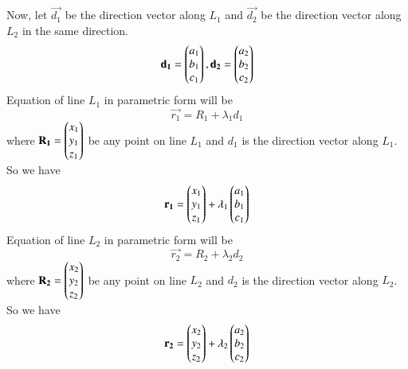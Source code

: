 \documentclass[journal,12pt,twocolumn]{IEEEtran}
\begin{document}
Now, let $\vec{d_1}$ be the direction vector along $L_1$ and $\vec{d_2}$ be the direction vector along $L_2$ in the same direction.
\begin{equation}
    \mathbf{d_1} = \begin{pmatrix}a_1\\b_1\\c_1\end{pmatrix}, \mathbf{d_2} = \begin{pmatrix}a_2\\b_2\\c_2\end{pmatrix} 
\end{equation}
Equation of line $L_1$ in parametric form will be
\begin{equation}
    \vec{r_1} = R_1 + \lambda{_1}d_1
\end{equation}
where $\mathbf{R_1} = \begin{pmatrix}x_1\\y_1\\z_1\end{pmatrix}$ be any point on line $L_1$ and $d_1$ is the direction vector along $L_1$. So we have
\begin{equation}\label{eq7}
    \mathbf{r_1} = \begin{pmatrix}x_1\\y_1\\z_1\end{pmatrix} + \lambda{_1}\begin{pmatrix}a_1\\b_1\\c_1\end{pmatrix}
\end{equation}
Equation of line $L_2$ in parametric form will be
\begin{equation}
    \vec{r_2} = R_2 + \lambda{_2}d_2
\end{equation}
where $\mathbf{R_2} = \begin{pmatrix}x_2\\y_2\\z_2\end{pmatrix}$ be any point on line $L_2$ and $d_2$ is the direction vector along $L_2$. So we have
\begin{equation}\label{eq6}
    \mathbf{r_2} = \begin{pmatrix}x_2\\y_2\\z_2\end{pmatrix} + \lambda{_2}\begin{pmatrix}a_2\\b_2\\c_2\end{pmatrix}
\end{equation}
\end{document}
